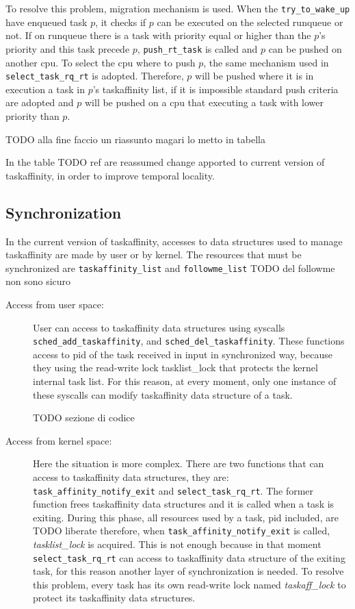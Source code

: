 To resolve this problem, migration mechanism is used. When the \texttt{try\_to\_wake\_up} have enqueued task $p$, it checks if $p$  can be executed on the 
selected runqueue or not. If on runqueue there is a task with priority equal or higher than the $p$'s priority and this task precede $p$, 
\texttt{push\_rt\_task} is called and $p$ can be pushed on another cpu. To select the cpu where to push $p$, the same mechanism used in 
\texttt{select\_task\_rq\_rt} is adopted. Therefore, $p$ will be pushed where it is in execution a task in $p$'s taskaffinity list, if it is impossible
standard push criteria are adopted and $p$ will be pushed on a cpu that executing a task with lower priority than $p$.

TODO alla fine faccio un riassunto magari lo metto in tabella

In the table TODO ref are reassumed change apported to current version of taskaffinity, in order to improve temporal locality.

\subsection{Synchronization}

In the current version of taskaffinity, accesses to data structures used to manage taskaffinity are made by user or by kernel. The resources that must be
synchronized are \texttt{taskaffinity\_list} and \texttt{followme\_list} TODO del followme non sono sicuro

\begin{description}
\item[Access from user space:] User can access to taskaffinity data structures using syscalls \texttt{sched\_add\_taskaffinity}, and 
\texttt{sched\_del\_taskaffinity}. These functions access to pid of the task received in input in synchronized way, because they using the read-write lock
tasklist\_lock that protects the kernel internal task list. For this reason, at every moment, only one instance of these syscalls can modify taskaffinity 
data structure of a task.

TODO sezione di codice

\item[Access from kernel space:] Here the situation is more complex. There are two functions that can access to taskaffinity data structures, they are:
\texttt{task\_affinity\_notify\_exit} and \texttt{select\_task\_rq\_rt}. The former function frees taskaffinity data structures and it is called when a 
task is exiting. During this phase, all resources used by a task, pid included, are TODO liberate therefore, when \texttt{task\_affinity\_notify\_exit} is 
called, \textit{tasklist\_lock} is acquired. This is not enough because in that moment \texttt{select\_task\_rq\_rt} can access to taskaffinity data 
structure of the exiting task, for this reason another layer of synchronization is needed. To resolve this problem, every task has its own read-write lock 
named \textit{taskaff\_lock} to protect its taskaffinity data structures. 

\end{description}

